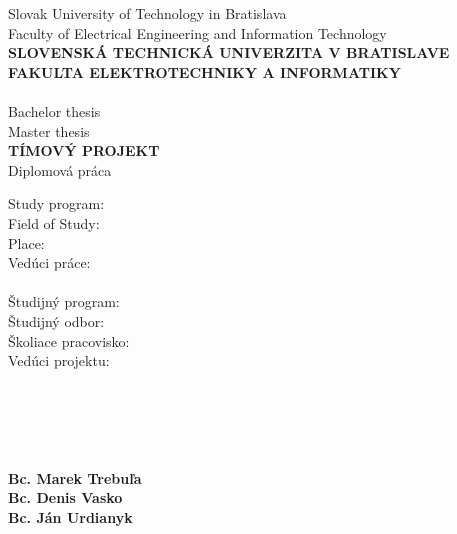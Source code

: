 
\newpage
\begin{center}
\thispagestyle{empty}
{
	{\large Slovak University of Technology in Bratislava}\textbf{}\\
	{\Large Faculty of Electrical Engineering and Information Technology}\textbf{}\\[\baselineskip]
}
{
	{\large \textbf{SLOVENSKÁ TECHNICKÁ UNIVERZITA V BRATISLAVE}}\\
	{\large \textbf{FAKULTA ELEKTROTECHNIKY A INFORMATIKY}}\\[\baselineskip]
}
\vspace*{5.5cm}
{\Large \textbf{\Title}}\textbf{}\\
{
	{
		{\large Bachelor thesis}\\
	}
	{
		{\large Master thesis}\\
	}
}
{
	{
		{\textbf {TÍMOVÝ PROJEKT}}\\
	}
	{
		{\large Diplomová práca}\\
	}
}
\end{center}
\vspace*{5cm}
{
	Study program: \Program\\ 
	Field of Study: \Field\\
	Place: \Place\\
	Vedúci práce: \Supervisor \\\\
}
{
	Študijný program: \hspace*{34.5mm} \Program\\ 
	Študijný odbor: \hspace*{39mm} \Field\\
	Školiace pracovisko: \hspace*{30mm} \Workspace\\
	Vedúci projektu: \hspace*{37.5mm} \Supervisor \\\\\\\\\\
}
\large \textbf{\Place \Year} \hspace*{6.5cm} \large \textbf{\Author}\\
\hspace*{10cm} \large \textbf{Bc. Marek Trebuľa}\\
\hspace*{10.0cm} \large \textbf{Bc. Denis Vasko}\\
\hspace*{10cm} \large \textbf{Bc. Ján Urdianyk}